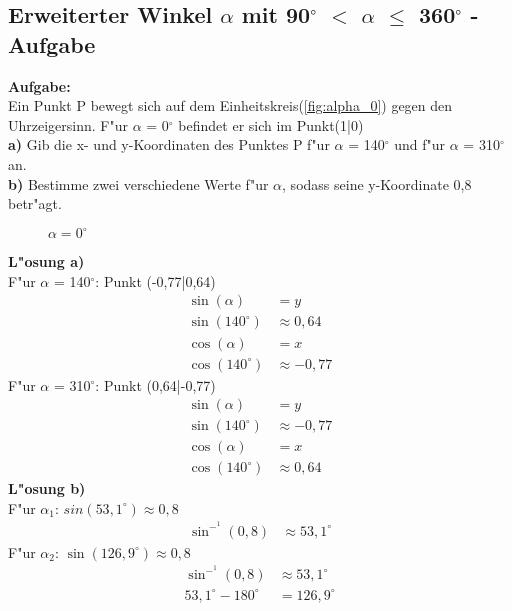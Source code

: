 \documentclass{standalone}
\begin{document}
\subsection{Erweiterter Winkel $\alpha$ mit 90$^\circ$  $<$ $\alpha$ $\leq$ 360$^\circ$  - Aufgabe}

\noindent\textbf{Aufgabe:}\\
Ein Punkt P bewegt sich auf dem Einheitskreis(\autoref{fig:alpha_0}) gegen den Uhrzeigersinn. F{"u}r $\alpha$ = 0$^\circ$  befindet er sich im Punkt(1|0)\\
\textbf{a)} Gib die x- und y-Koordinaten des Punktes P f{"u}r $\alpha$ = 140$^\circ$  und f{"u}r $\alpha$ = 310$^\circ$  an.\\
\textbf{b)} Bestimme zwei verschiedene Werte f{"u}r $\alpha$, sodass seine y-Koordinate 0,8 betr{"a}gt.\\

\begin{figure}[hb!]
  \centering
  \def\svgwidth{200px}
  
  \caption{$\alpha = 0^\circ $}
  \label{fig:alpha_0}
\end{figure}

\newpage

\noindent\textbf{L{"o}sung a)}\\
\noindent F{"u}r $\alpha$ = 140$^\circ$: Punkt (-0,77|0,64)
\begin{align}
  \sin(\alpha)     & = y \tag{1}           \\
  \sin(140^\circ ) & \approx 0,64 \tag{2}  \\
  \cos(\alpha)     & = x \tag{3}           \\
  \cos(140^\circ ) & \approx -0,77 \tag{4}
\end{align}
\noindent F{"u}r $\alpha$ = 310$^\circ$: Punkt (0,64|-0,77)
\begin{align}
  \sin(\alpha)     & = y \tag{1}           \\
  \sin(140^\circ ) & \approx -0,77 \tag{2} \\
  \cos(\alpha)     & = x \tag{3}           \\
  \cos(140^\circ ) & \approx 0,64 \tag{4}
\end{align}
\noindent\textbf{L{"o}sung b)}\\
\noindent F{"u}r $\alpha_1$: $sin(53,1^\circ) \approx 0,8$
\begin{align}
  \sin^-^1(0,8) & \approx 53,1^\circ \tag{1}
\end{align}
\noindent F{"u}r $\alpha_2$: $\sin(126,9^\circ) \approx 0,8$
\begin{align}
  \sin^-^1(0,8)          & \approx 53,1^\circ \tag{1} \\
  53,1^\circ - 180^\circ & = 126,9^\circ \tag{2}
\end{align}
\end{document}

